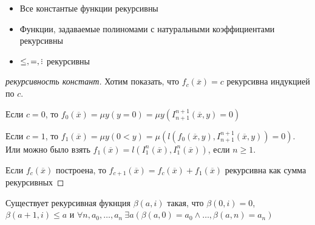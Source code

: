 \begin{exmpl}
    \begin{itemize}\
        \item Все константые функции рекурсивны
        \item Функции, задаваемые полиномами с натуральными коэффициентами рекурсивны
        \item $\le, =, \divby$ рекурсивны
    \end{itemize}
\end{exmpl}

\begin{proof}[рекурсивность констант]
    Хотим показать, что $f_c (\overline{x}) = c$ рекурсивна индукцией по $c$.

    Если $c=0$, то $f_0 (\overline{x}) = \mu y(y=0) = \mu y (I_{n+1}^{n+1} (\overline{x}, y) =0)$

    Если $c=1$, то $f_1 (\overline{x}) = \mu y (0<y) = \mu (l(f_0 (\overline{x}, y), I_{n+1}^{n+1} (\overline{x}, y))=0)$. Или можно было взять $f_1 (\overline{x}) = l(I_1^n (\overline{x}), I_1^n (\overline{x}) )$, если $n\ge 1$.

    Если $f_c (\overline{x}) $ построена, то $f_{c+1} (\overline{x}) = f_c (\overline{x}) + f_1 (\overline{x}) $ рекурсивна как сумма рекурсивных %
\end{proof}

\begin{prop}
    Существует рекурсивная фукнция $\beta(a, i)$ такая, что $\beta(0, i) = 0$, $\beta(a+1, i)\le a$ и $\forall n, a_0, \ldots, a_n~\exists a (\beta(a, 0)=a_0 \wedge \ldots, \beta(a, n)=a_n)$
\end{prop}


